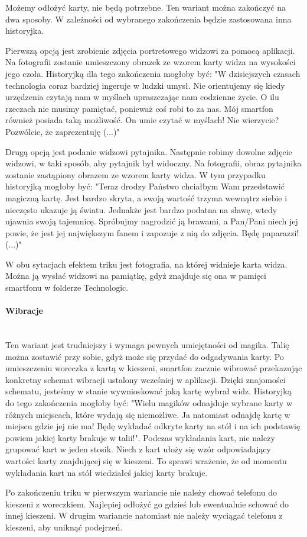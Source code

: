 Możemy odłożyć karty, nie będą potrzebne. Ten wariant można zakończyć na dwa sposoby. W zależności od wybranego zakończenia będzie zastosowana inna historyjka. \par 
Pierwszą opcją jest zrobienie zdjęcia portretowego widzowi za pomocą aplikacji. Na fotografii zostanie umieszczony obrazek ze wzorem karty widza na wysokości jego czoła. Historyjką dla tego zakończenia mogłoby być: "W dzisiejszych czasach technologia coraz bardziej ingeruje w ludzki umysł. Nie orientujemy się kiedy urzędzenia czytają nam w myślach upraszczając nam codzienne życie. O ilu rzeczach nie musimy pamiętać, ponieważ coś robi to za nas. Mój smartfon również posiada taką możliwość. On umie czytać w myślach! Nie wierzycie? Pozwólcie, że zaprezentuję (...)"\par
Drugą opcją jest podanie widzowi pytajnika. Następnie robimy dowolne zdjęcie widzowi, w taki sposób, aby pytajnik był widoczny. Na fotografii, obraz pytajnika zostanie zastąpiony obrazem ze wzorem karty widza. W tym przypadku historyjką mogłoby być: "Teraz drodzy Państwo chciałbym Wam przedstawić magiczną kartę. Jest bardzo skryta, a swoją wartość trzyma wewnątrz siebie i nieczęsto ukazuje ją światu. Jednakże jest bardzo podatna na sławę, wtedy ujawnia swoją tajemnicę. Spróbujmy nagrodzić ją brawami, a Pan/Pani niech jej powie, że jest jej największym fanem i zapozuje z nią do zdjęcia. Będę paparazzi! (...)"\par
W obu sytacjach efektem triku jest fotografia, na której widnieje karta widza. Można ją wysłać widzowi na pamiątkę, gdyż znajduje się ona w pamięci smartfonu w folderze Technologic.
\paragraph{Wibracje}\mbox{}\\
Ten wariant jest trudniejszy i wymaga pewnych umiejętności od magika. Talię można zostawić przy sobie, gdyż może się przydać do odgadywania karty. Po umieszczeniu woreczka z kartą w kieszeni, smartfon zacznie wibrować przekazując konkretny schemat wibracji ustalony wcześniej w aplikacji. Dzięki znajomości schematu, jesteśmy w stanie wywnioskować jaką kartę wybrał widz. Historyjką do tego zakończenia mogłoby być: "Wielu magików odnajduje wybrane karty w różnych miejscach, które wydają się niemożliwe. Ja natomiast odnajdę kartę w miejscu gdzie jej nie ma! Będę wykładać odkryte karty na stół i na ich podstawię powiem jakiej karty brakuje w talii!". Podczas wykładania kart, nie należy grupować kart w jeden stosik. Niech z kart ułoży się wzór  odpowiadający wartości karty znajdującej się w kieszeni. To sprawi wrażenie, że od momentu wykładania kart na stół wiedziałeś jakiej karty brakuje.\par
Po zakończeniu triku w pierwszym wariancie nie należy chować telefonu do kieszeni z woreczkiem. Najlepiej odłożyć go gdzieś lub ewentualnie schować do innej kieszeni. W drugim wariancie natomiast nie należy wyciągać telefonu z kieszeni, aby uniknąć podejrzeń.
